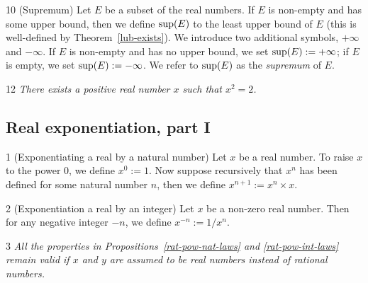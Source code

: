 \begin{definition}{10}
    \label{supremum}
    (Supremum) Let $E$ be a subset of the real numbers. If $E$ is non-empty and
    has some upper bound, then we define $\text{sup}{(E)}$ to the least upper bound of $E$
    (this is well-defined by Theorem~\ref{lub-exists}). We introduce two additional symbols,
    $+\infty$ and $-\infty$. If $E$ is non-empty and has no upper bound, we set
    $\text{sup}{(E)} := +\infty$; if $E$ is empty, we set $\text{sup}{(E)} := -\infty$.
    We refer to $\text{sup}{(E)}$ as the \emph{supremum} of $E$.
\end{definition}

\begin{proposition}{12}
    \label{sqrt-two-exists}
    \emph{There exists a positive real number $x$ such that $x^2 = 2$.}
\end{proposition}

\subsection{Real exponentiation, part I}
\begin{definition}{1}
    \label{real-pow-nat}
    (Exponentiating a real by a natural number) Let $x$ be a real number. To
    raise $x$ to the power $0$, we define $x^0 := 1$. Now suppose recursively
    that $x^n$ has been defined for some natural number $n$, then we define
    $x^{n+1} := x^n \times x$.
\end{definition}

\begin{definition}{2}
    \label{real-pow-int}
    (Exponentiation a real by an integer) Let $x$ be a non-zero real number.
    Then for any negative integer $-n$, we define $x^{-n} := 1/x^n$.
\end{definition}

\begin{proposition}{3}
    \label{real-pow-int-laws}
    \emph{All the properties in Propositions~\ref{rat-pow-nat-laws} and \ref{rat-pow-int-laws} remain valid if
    $x$ and $y$ are assumed to be real numbers instead of rational numbers.}
\end{proposition}

